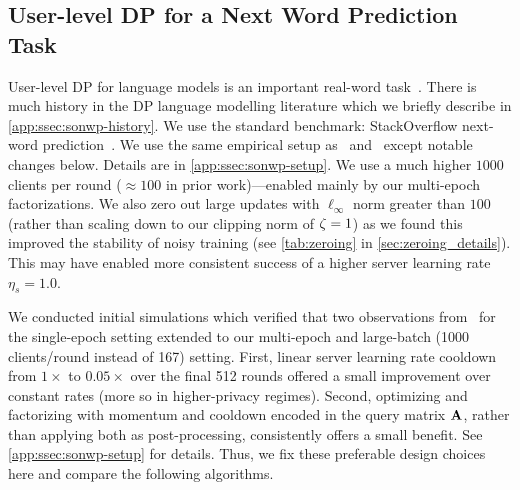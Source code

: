 \documentclass{article} %
\theoremstyle{named}
\begin{document}
\subsection{User-level DP for a Next Word Prediction Task}\label{ssec:federated-experiments}
User-level DP for language models is an important real-word task~\citep{mcmahan2022dpftrlblog}. There is much history in the DP language modelling literature which we briefly describe in \cref{app:ssec:sonwp-history}. We use the standard benchmark: StackOverflow next-word prediction~\citep{reddi20adaptive}. We use the same empirical setup as~\citet{kairouz2021practical} and~\citet{denisov22matfact} except notable changes below. Details are in \cref{app:ssec:sonwp-setup}.
 We use a much higher $1000$ clients per round ($\approx 100$ in prior work)---enabled mainly by our multi-epoch factorizations. We also zero out large updates with $\ell_\infty$ norm greater than $100$ (rather than scaling down to our clipping norm of $\zeta = 1$) as we found this improved the stability of noisy training (see \cref{tab:zeroing} in \cref{sec:zeroing_details}). This may have enabled more consistent success of a higher server learning rate $ \eta_s = 1.0$.

We conducted initial simulations which verified that two observations from~\citet{denisov22matfact} for the single-epoch setting extended to our multi-epoch and large-batch (1000 clients/round instead of 167) setting. First, linear server learning rate cooldown from $1\times$ to $0.05\times$ over the final 512 rounds offered a small improvement over constant rates (more so in higher-privacy regimes). Second, optimizing and factorizing with momentum and cooldown encoded in the query matrix $\mathbf{A}$, rather than applying both as post-processing, consistently offers a small benefit. See \cref{app:ssec:sonwp-setup} for details. Thus, we fix these preferable design choices here and compare the following algorithms.
\end{document}
